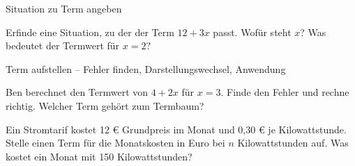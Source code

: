 \begin{aufgabe}{Situation zu Term angeben}
\begin{teile}
\teil Erfinde eine Situation, zu der der Term $12 + 3x$ passt. Wofür steht $x$? Was bedeutet der Termwert für $x = 2$?
\end{teile}
\end{aufgabe}

\begin{aufgabe}{Term aufstellen – Fehler finden, Darstellungswechsel, Anwendung}
\begin{teile}
\teil Ben berechnet den Termwert von $4 + 2x$ für $x = 3$. Finde den Fehler und rechne richtig. 
\teil Welcher Term gehört zum Termbaum?

\leerfeld
\teil Ein Stromtarif kostet 12 € Grundpreis im Monat und 0,30 € je Kilowattstunde. Stelle einen Term für die Monatskosten in Euro bei $n$ Kilowattstunden auf. Was kostet ein Monat mit 150 Kilowattstunden?
\end{teile}
\end{aufgabe}
